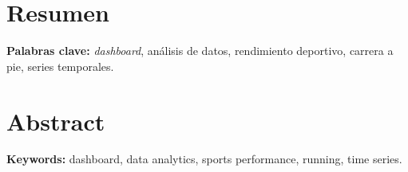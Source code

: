 
\chapter*{Resumen}


\textbf{Palabras clave:} \textit{dashboard}, análisis de datos, rendimiento deportivo, carrera a pie, series temporales.

\chapter*{Abstract}


\textbf{Keywords:} dashboard, data analytics, sports performance, running, time series.
